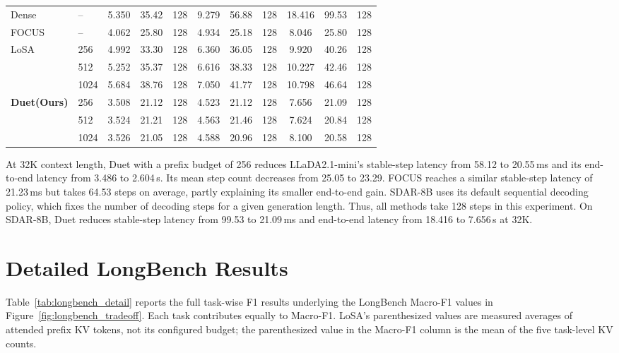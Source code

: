 \begin{table}[ht]
{\begin{tabular}{@{}ll*{9}{c}@{}}
\midrule
Dense & -- & 5.350 & 35.42 & 128 & 9.279 & 56.88 & 128 & 18.416 & 99.53 & 128 \\
FOCUS & -- & 4.062 & 25.80 & 128 & 4.934 & 25.18 & 128 & 8.046 & 25.80 & 128 \\
LoSA & 256 & 4.992 & 33.30 & 128 & 6.360 & 36.05 & 128 & 9.920 & 40.26 & 128 \\
     & 512 & 5.252 & 35.37 & 128 & 6.616 & 38.33 & 128 & 10.227 & 42.46 & 128 \\
     & 1024 & 5.684 & 38.76 & 128 & 7.050 & 41.77 & 128 & 10.798 & 46.64 & 128 \\
\textbf{Duet(Ours)} & 256 & 3.508 & 21.12 & 128 & 4.523 & 21.12 & 128 & 7.656 & 21.09 & 128 \\
     & 512 & 3.524 & 21.21 & 128 & 4.563 & 21.46 & 128 & 7.624 & 20.84 & 128 \\
     & 1024 & 3.526 & 21.05 & 128 & 4.588 & 20.96 & 128 & 8.100 & 20.58 & 128 \\
\bottomrule
\end{tabular}%
}
\endgroup
\end{table}

At 32K context length, Duet with a prefix budget of 256 reduces
LLaDA2.1-mini's stable-step latency from 58.12 to 20.55\,ms and its
end-to-end latency from 3.486 to 2.604\,s. Its mean step count decreases
from 25.05 to 23.29. FOCUS reaches a similar stable-step latency of
21.23\,ms but takes 64.53 steps on average, partly explaining its smaller
end-to-end gain. SDAR-8B uses its default sequential decoding policy, which
fixes the number of decoding steps for a given generation length. Thus, all
methods take 128 steps in this experiment. On SDAR-8B, Duet reduces
stable-step latency from 99.53 to 21.09\,ms and end-to-end latency from
18.416 to 7.656\,s at 32K.



\clearpage
\section{Detailed LongBench Results}

Table~\ref{tab:longbench_detail} reports the full task-wise F1 results
underlying the LongBench Macro-F1 values in
Figure~\ref{fig:longbench_tradeoff}. Each task contributes equally to
Macro-F1. LoSA's parenthesized values are measured averages of attended
prefix KV tokens, not its configured budget; the parenthesized value in
the Macro-F1 column is the mean of the five task-level KV counts.

